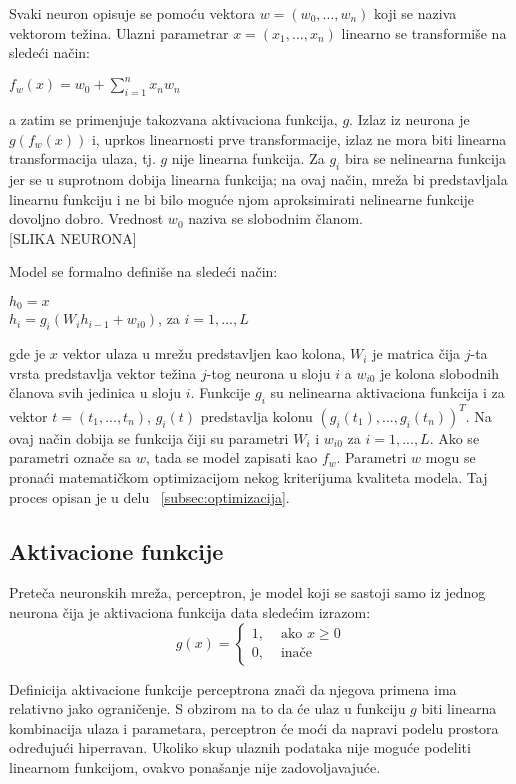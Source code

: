\par
Svaki neuron opisuje se pomoću vektora $w = (w_0, ..., w_n)$ koji se naziva vektorom težina. Ulazni parametrar $x = (x_1, ..., x_n)$ linearno se transformiše na sledeći način:
\begin{center}
	$f_w(x) = w_0 + \sum_{i=1}^{n} x_nw_n $
\end{center}
a zatim se primenjuje takozvana aktivaciona funkcija, $g$. Izlaz iz neurona je $g(f_w(x))$ i, uprkos linearnosti prve transformacije, izlaz ne mora biti linearna transformacija ulaza, tj. $g$ nije linearna funkcija. Za $g_i$ bira se nelinearna funkcija jer se u suprotnom dobija linearna funkcija; na ovaj način, mreža bi predstavljala linearnu funkciju i ne bi bilo moguće njom aproksimirati nelinearne funkcije dovoljno dobro.  Vrednost $w_0$ naziva se slobodnim članom. \\

[SLIKA NEURONA]

Model se formalno definiše na sledeći način:
\begin{center}
	$ h_0 = x $  \\
	$ h_i = g_i(W_ih_{i-1} + w_{i0})$, za $i=1, ..., L$
\end{center}
gde je $x$ vektor ulaza u mrežu predstavljen kao kolona, $W_i$ je matrica čija $j$-ta vrsta predstavlja vektor težina $j$-tog neurona u sloju $i$ a $w_{i0}$ je kolona slobodnih članova svih jedinica u sloju $i$. Funkcije $g_i$ su nelinearna aktivaciona funkcija i za vektor $t=(t_1, ..., t_n)$, $g_i(t)$ predstavlja kolonu $(g_i(t_1), ..., g_i(t_n))^T$. Na ovaj način dobija se funkcija čiji su parametri $W_i$ i $w_{i0}$ za $i=1,...,L$. Ako se parametri označe sa $w$, tada se model zapisati kao $f_w$. Parametri $w$ mogu se pronaći matematičkom optimizacijom nekog kriterijuma kvaliteta modela. Taj proces opisan je u delu ~\ref{subsec:optimizacija}.

\subsection{Aktivacione funkcije}


Preteča neuronskih mreža, perceptron, je model koji se sastoji samo iz jednog neurona čija je aktivaciona funkcija data sledećim izrazom:
\[ g(x)=
\begin{cases}
	1, 	& \text{~ako~} x \geq 0 \\
	0, 	& \text{~inače}
\end{cases}
\]

Definicija aktivacione funkcije perceptrona znači da njegova primena ima relativno jako ograničenje. S obzirom na to da će ulaz u funkciju $g$ biti linearna kombinacija ulaza i parametara, perceptron će moći da napravi podelu prostora određujući hiperravan. Ukoliko skup ulaznih podataka nije moguće podeliti linearnom funkcijom, ovakvo ponašanje nije zadovoljavajuće.

